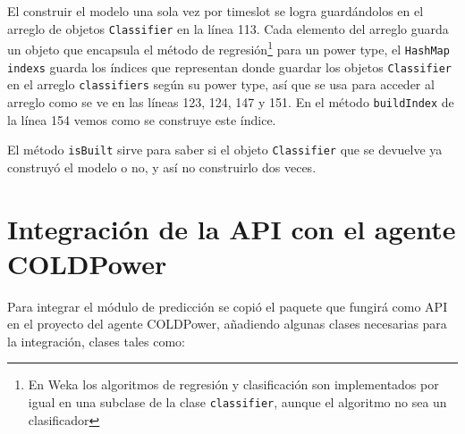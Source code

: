 El construir el modelo una sola vez por timeslot se logra guardándolos en el arreglo de objetos \texttt{Classifier} en la línea 113. Cada elemento del arreglo guarda un objeto que encapsula el método de regresión\footnote{En Weka los algoritmos de regresión y clasificación son implementados por igual en una subclase de la clase \texttt{classifier}, aunque el algoritmo no sea un clasificador} para un power type, el \texttt{HashMap indexs} guarda los índices que representan donde guardar los objetos \texttt{Classifier} en el arreglo \texttt{classifiers} según su power type, así que se usa para acceder al arreglo como se ve en las líneas 123, 124, 147 y 151. En el método \texttt{buildIndex} de la línea 154 vemos como se construye este índice.

El método \texttt{isBuilt} sirve para saber si el objeto \texttt{Classifier} que se devuelve ya construyó el modelo o no, y así no construirlo dos veces.

\section{Integración de la API con el agente COLDPower} \label{sec:integracionAPI}

Para integrar el módulo de predicción  %
se copió el paquete que fungirá como API en el proyecto del agente COLDPower, añadiendo algunas clases necesarias para la integración, clases tales como:

